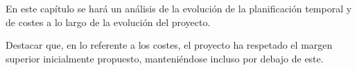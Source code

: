 En este capítulo se hará un análisis de la evolución de la planificación temporal y de costes a lo largo de la evolución del proyecto.

Destacar que, en lo referente a los costes, el proyecto ha respetado el margen superior inicialmente propuesto, manteniéndose incluso por debajo de este.